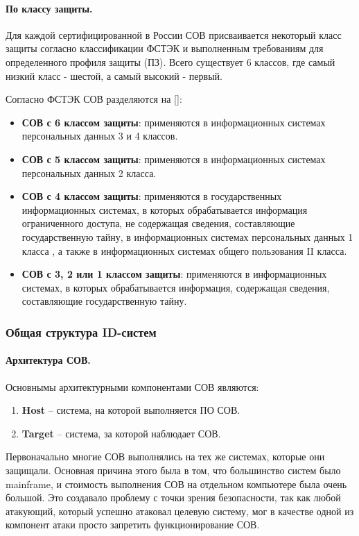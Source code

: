\paragraph*{По классу защиты.}

Для каждой сертифицированной в России СОВ присваивается некоторый класс защиты 
согласно классификации ФСТЭК и выполненным требованиям для определенного профиля защиты (ПЗ).
Всего существует 6 классов, где самый низкий класс - шестой, а самый высокий - первый.

Согласно ФСТЭК СОВ разделяются на [\cite{IDSFSTEK}]:
\begin{itemize}
	\item \textbf{СОВ с 6 классом защиты}: применяются в информационных системах персональных данных 3 и 4 классов.
	\item \textbf{СОВ с 5 классом защиты}: применяются в информационных системах персональных данных 2 класса.
	\item \textbf{СОВ с 4 классом защиты}: применяются в государственных информационных системах, 
	в которых обрабатывается информация ограниченного доступа, не содержащая сведения, 
	составляющие государственную тайну, в информационных системах персональных данных 1 класса , 
	а также в информационных системах общего пользования II класса.
	\item \textbf{СОВ с 3, 2 или 1 классом защиты}: применяются в информационных системах, 
	в которых обрабатывается информация, содержащая сведения, составляющие государственную тайну.
\end{itemize}



\subsubsection{Общая структура ID-систем} 


\paragraph*{Архитектура СОВ.} Основнымы архитектурными компонентами СОВ являются: 

\begin{enumerate}
	\item \textbf{Host} -- система, на которой выполняется ПО СОВ.
	\item \textbf{Target} -- система, за которой наблюдает СОВ.
\end{enumerate}

Первоначально многие СОВ выполнялись на тех же системах, которые они защищали. 
Основная причина этого была в том, что большинство систем было mainframe, и стоимость выполнения СОВ 
на отдельном компьютере была очень большой. Это создавало проблему с точки зрения безопасности, так как 
любой атакующий, который успешно атаковал целевую систему, мог в качестве одной из компонент атаки просто 
запретить функционирование СОВ.

